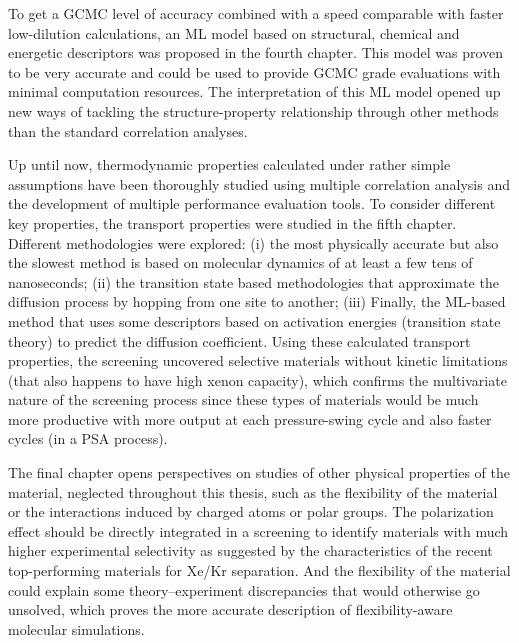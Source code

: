 To get a GCMC level of accuracy combined with a speed comparable with faster low-dilution calculations, an ML model based on structural, chemical and energetic descriptors was proposed in the fourth chapter.\autocite{Ren_2023_ml} This model was proven to be very accurate and could be used to provide GCMC grade evaluations with minimal computation resources. The interpretation of this ML model opened up new ways of tackling the structure-property relationship through other methods than the standard correlation analyses. 

Up until now, thermodynamic properties calculated under rather simple assumptions have been thoroughly studied using multiple correlation analysis and the development of multiple performance evaluation tools. To consider different key properties, the transport properties were studied in the fifth chapter. Different methodologies were explored: (i) the most physically accurate but also the slowest method is based on molecular dynamics of at least a few tens of nanoseconds; (ii) the transition state based methodologies that approximate the diffusion process by hopping from one site to another; (iii) Finally, the ML-based method that uses some descriptors based on activation energies (transition state theory) to predict the diffusion coefficient. Using these calculated transport properties, the screening uncovered selective materials without kinetic limitations (that also happens to have high xenon capacity), which confirms the multivariate nature of the screening process since these types of materials would be much more productive with more output at each pressure-swing cycle and also faster cycles (in a PSA process). 

The final chapter opens perspectives on studies of other physical properties of the material, neglected throughout this thesis, such as the flexibility of the material or the interactions induced by charged atoms or polar groups. The polarization effect should be directly integrated in a screening to identify materials with much higher experimental selectivity as suggested by the characteristics of the recent top-performing materials for Xe/Kr separation.\autocite{Li_2019,Pei_2022} And the flexibility of the material could explain some theory--experiment discrepancies that would otherwise go unsolved, which proves the more accurate description of flexibility-aware molecular simulations.

 
\begin{center}
\end{center}


